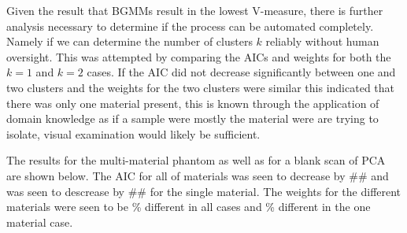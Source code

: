 \documentclass[a4paper,11pt]{article}
\begin{document}
Given the result that BGMMs result in the lowest V-measure, there is further analysis necessary to determine if the process can be automated completely. Namely if we can determine the number of clusters $k$ reliably without human oversight. This was attempted by comparing the AICs and weights for both the $k=1$ and $k=2$ cases. If the AIC did not decrease significantly between one and two clusters and the weights for the two clusters were similar this indicated that there was only one material present, this is known through the application of domain knowledge as if a sample were mostly the material were are trying to isolate, visual examination would likely be sufficient. 

The results for the multi-material phantom as well as for a blank scan of PCA are shown below. The AIC for all of materials was seen to decrease by \#\# and was seen to descrease by \#\# for the single material. The weights for the different materials were seen to be \% different in all cases and \% different in the one material case.
\end{document}
